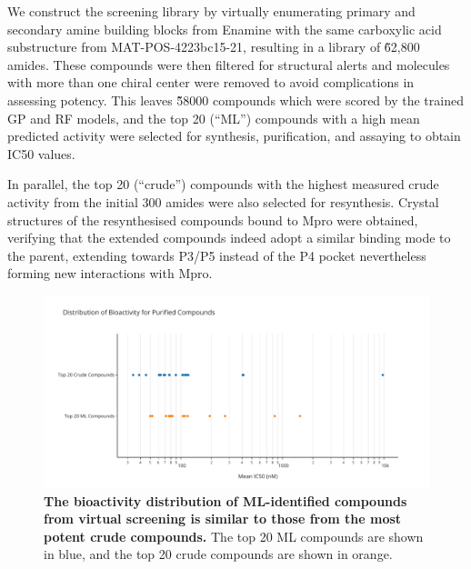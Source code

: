 We construct the screening library by virtually enumerating primary and secondary amine building blocks from Enamine with the same carboxylic acid substructure from MAT-POS-4223bc15-21, resulting in a library of \~62,800 amides. These compounds were then filtered for structural alerts and molecules with more than one chiral center were removed to avoid complications in assessing potency. This leaves \~58000 compounds which were scored by the trained GP and RF models, and the top 20 (``ML'') compounds with a high mean predicted activity were selected for synthesis, purification, and assaying to obtain IC50 values.


In parallel, the top 20 (``crude'') compounds with the highest measured crude activity from the initial 300 amides were also selected for resynthesis. Crystal structures of the resynthesised compounds bound to Mpro were obtained, verifying that the extended compounds indeed adopt a similar binding mode to the parent, extending towards P3/P5 instead of the P4 pocket nevertheless forming new interactions with Mpro.

\begin{figure}[!]
 \centering
 \includegraphics[width=\textwidth]{Chapters/Crude/Figs/strip_plot.pdf}
 \caption{\textbf{The bioactivity distribution of ML-identified compounds from virtual screening is similar to those from the most potent crude compounds.} The top 20 ML compounds are shown in blue, and the top 20 crude compounds are shown in orange.}
 \label{fig:strip}
\end{figure}

